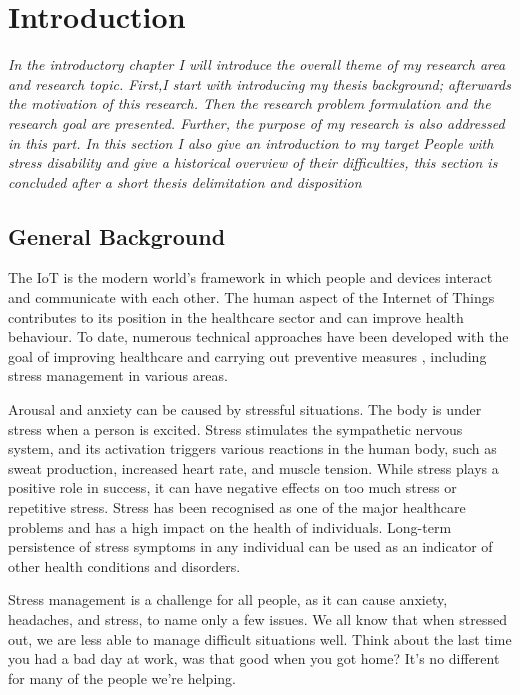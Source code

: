 \chapter{Introduction}
\textit{In the introductory chapter I will introduce the  overall  theme  of  my research area  and research  topic. First,I start with introducing my thesis background;  afterwards  the motivation of this research. Then the research problem formulation and the research goal are presented. Further, the purpose of my research is also addressed in this part. In this section I also give an introduction to my target People with stress disability and  give  a  historical  overview  of  their  difficulties, this section is concluded after a short thesis delimitation and disposition}
\vspace{5mm}

\section{General Background}
The \acf{IoT} is the modern world's framework in which people and devices interact and communicate with each other.  The human aspect of the Internet of Things contributes to its position in the healthcare sector and can improve health behaviour. To date, numerous technical approaches have been developed with the goal of improving healthcare and carrying out preventive measures \citep{Trmcic2017InternetWell-being}, including stress management in various areas.

Arousal and anxiety can be caused by stressful situations.  The body is under stress when a person is excited. Stress stimulates the sympathetic nervous system, and its activation triggers various reactions in the human body, such as sweat production, increased heart rate, and muscle tension. While stress plays a positive role in success, it can have negative effects on too much stress or repetitive stress. Stress has been recognised as one of the major healthcare problems and has a high impact on the health of individuals. Long-term persistence of stress symptoms in any individual can be used as an indicator of other health conditions and disorders.

Stress management is a challenge for all people, as it can cause anxiety, headaches, and stress, to name only a few issues. We all know that when stressed out, we are less able to manage difficult situations well. Think about the last time you had a bad day at work, was that good when you got home? It's no different for many of the people we're helping.

